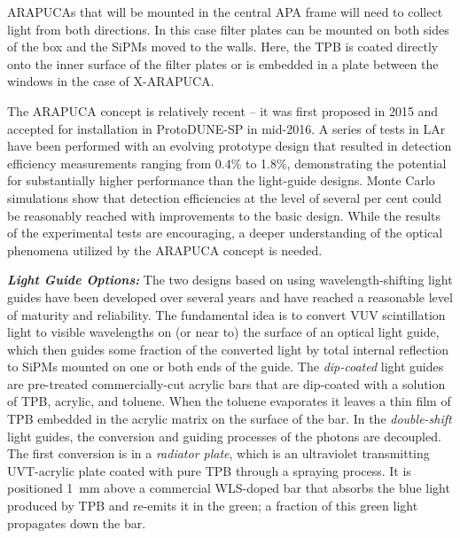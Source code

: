 ARAPUCAs that will be mounted in the central APA frame will need to collect light from both directions. In this case filter plates can be mounted on both sides of the box and the SiPMs moved to the walls.  Here, the TPB is coated directly onto the inner surface of the filter plates or is embedded in a plate between the windows in the case of X-ARAPUCA. 

The ARAPUCA concept is relatively recent -- it was first proposed in 2015 and accepted for installation in ProtoDUNE-SP in mid-2016. A series of tests in LAr have been performed with an evolving prototype design that resulted in detection efficiency measurements ranging from  \num{0.4}\% to \num{1.8}\%, demonstrating the potential for substantially higher performance than the light-guide designs. Monte Carlo simulations show that detection efficiencies at the level of several per cent could be reasonably reached with improvements to the basic design. 
While the results of the experimental tests are encouraging, a deeper understanding of the optical phenomena utilized by the ARAPUCA concept is needed.

{\it\bf Light Guide Options:} The two designs based on using wavelength-shifting light guides have been developed over several years and have reached a reasonable level of maturity and reliability.  
The fundamental idea is to convert VUV scintillation light to visible wavelengths on (or near to) the surface of an optical light guide, which then guides some fraction of the converted light by total internal reflection to SiPMs mounted on one or both ends of the guide.
The {\it dip-coated} light guides are pre-treated commercially-cut acrylic bars that are dip-coated with a solution of TPB, acrylic, and toluene. When the toluene evaporates it leaves a thin film of TPB embedded in the acrylic matrix on the surface of the bar.  In the {\it double-shift} light guides, the conversion and guiding processes of the photons are decoupled. The first conversion is in a {\it radiator plate}, which is an ultraviolet transmitting UVT-acrylic plate coated with pure TPB through a spraying process. It is positioned \SI{1}{mm} above a commercial WLS-doped bar that absorbs the blue light produced by TPB and re-emits it in the green; a fraction of this green light propagates down the bar. 

